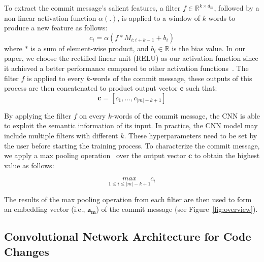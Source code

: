 To extract the commit message's salient features, a filter $f \in \mathbb{R}^{k \times {d_m}}$, followed by a non-linear activation function $\alpha (.)$, is applied to a window of $k$ words to produce a new feature as follows:
\begin{equation}
\label{eq:filter_msg}
    c_i = \alpha(f * M_{i:i+k-1} + b_i)
\end{equation}
where $*$ is a sum of element-wise product, and $b_i \in \mathbb{R}$ is the bias value. In our paper, we choose the rectified linear unit (RELU) as our activation function since it achieved a better performance compared to other activation functions~\cite{nair2010rectified, dahl2013improving, he2016deep}. The filter $f$ is applied to every $k$-words of the commit message, these outputs of this process are then concatenated to product output vector $\textbf{c}$ such that:
\begin{equation}
\label{eq:output_ftr_msg}
\textbf{c} = [c_1, \dots, c_{|m| - k + 1}]
\end{equation}

By applying the filter $f$ on every $k$-words of the commit message, the CNN is able to exploit the semantic information of its input. In practice, the CNN model may include multiple filters with different $k$. These hyperparameters need to be set by the user before starting the training process. To characterize the commit message, we apply a max pooling operation~\cite{lecun2015deep} over the output vector $\textbf{c}$ to obtain the highest value as follows: 

\begin{equation}
\label{eq:max_pooling_msg}
\underset{1 \leq i \leq |m| - k + 1}{max} c_i
\end{equation}

The results of the max pooling operation from each filter are then used to form an embedding vector (i.e., $\textbf{z}_\textbf{m}$) of the commit message (see Figure~\ref{fig:overview}). 

\subsection{Convolutional Network Architecture for Code Changes}
\label{sec:cnn_code}

